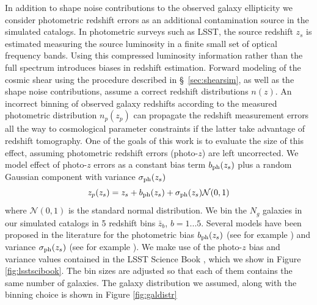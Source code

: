 \documentclass[reprint,aps,prd,superscriptaddress,showkeys,showpacs]{revtex4-1}
\begin{document}
In addition to shape noise contributions to the observed galaxy ellipticity we consider photometric redshift errors as an additional contamination source in the simulated catalogs. In photometric surveys such as LSST, the source redshift $z_s$ is estimated measuring the source luminosity in a finite small set of optical frequency bands. Using this compressed luminosity information rather than the full spectrum introduces biases in redshift estimation. Forward modeling of the cosmic shear using the procedure described in \S~\ref{sec:shearsim}, as well as the shape noise contributions, assume a correct redshift distributions $n(z)$. An incorrect binning of observed galaxy redshifts according to the measured photometric distribution $n_p(z_p)$ can propagate the redshift measurement errors all the way to cosmological parameter constraints if the latter take advantage of redshift tomography. One of the goals of this work is to evaluate the size of this effect, assuming photometric redshift errors (photo-$z$) are left uncorrected. We model effect of photo-$z$ errors as a constant bias term $b_{\rm ph}(z_s)$ plus a random Gaussian component with variance $\sigma_{\rm ph}(z_s)$
\begin{equation}
\label{meth:photoz-correction}
z_p(z_s) = z_s + b_{\rm ph}(z_s) + \sigma_{\rm ph}(z_s)\mathcal{N}(0,1)   
\end{equation}
%
where $\mathcal{N}(0,1)$ is the standard normal distribution. We bin the $N_g$ galaxies in our simulated catalogs in 5 redshift bins $\bar{z}_b$, $b=1...5$. Several models have been proposed in the literature for the photometric bias $b_{\rm ph}(z_s)$ (see for example \citep{Huterer2006}) and variance $\sigma_{\rm ph}(z_s)$ (see for example \citep{LSSTSciBook}). We make use of the photo-$z$ bias and variance values contained in the LSST Science Book \citep{LSSTSciBook}, which we show in Figure \ref{fig:lsstscibook}. The bin sizes are adjusted so that each of them contains the same number of galaxies. The galaxy distribution we assumed, along with the binning choice is shown in Figure \ref{fig:galdistr}
\end{document}
